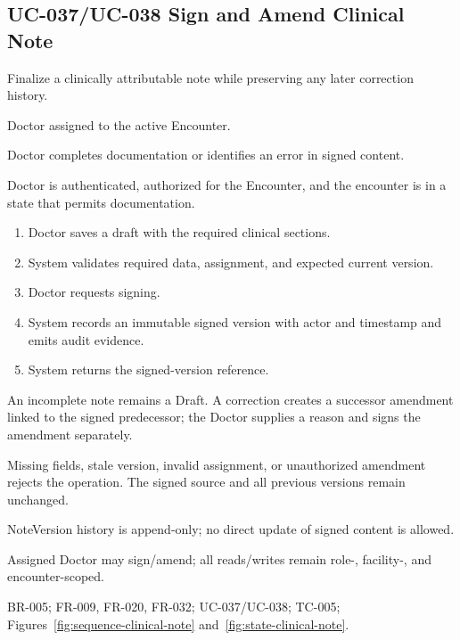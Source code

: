 \documentclass[a4paper,12pt]{article}
\begin{document}
\subsection{UC-037/UC-038 Sign and Amend Clinical Note}
\begin{description}[leftmargin=2.6cm,style=nextline]
\item[Goal] Finalize a clinically attributable note while preserving any later correction history.
\item[Primary actor] Doctor assigned to the active Encounter.
\item[Trigger] Doctor completes documentation or identifies an error in signed content.
\item[Preconditions] Doctor is authenticated, authorized for the Encounter, and the encounter is in a state that permits documentation.
\item[Main success flow]
\begin{enumerate}[leftmargin=1.4em]
  \item Doctor saves a draft with the required clinical sections.
  \item System validates required data, assignment, and expected current version.
  \item Doctor requests signing.
  \item System records an immutable signed version with actor and timestamp and emits audit evidence.
  \item System returns the signed-version reference.
\end{enumerate}
\item[Alternative flows] An incomplete note remains a Draft. A correction creates a successor amendment linked to the signed predecessor; the Doctor supplies a reason and signs the amendment separately.
\item[Exception flows] Missing fields, stale version, invalid assignment, or unauthorized amendment rejects the operation. The signed source and all previous versions remain unchanged.
\item[Postconditions and data] NoteVersion history is append-only; no direct update of signed content is allowed.
\item[Authorization] Assigned Doctor may sign/amend; all reads/writes remain role-, facility-, and encounter-scoped.
\item[Trace] BR-005; FR-009, FR-020, FR-032; UC-037/UC-038; TC-005; Figures~\ref{fig:sequence-clinical-note} and~\ref{fig:state-clinical-note}.
\end{description}
\end{document}
